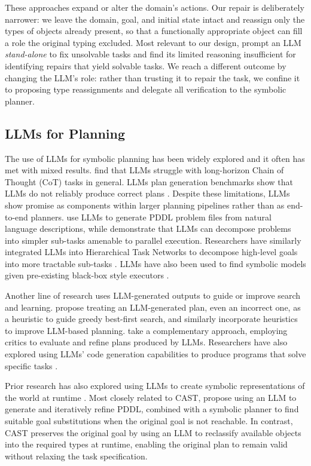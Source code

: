These approaches expand or alter the domain's actions. Our repair is deliberately narrower: we leave the domain, goal, and initial state intact and reassign only the types of objects already present, so that a functionally appropriate object can fill a role the original typing excluded. Most relevant to our design, \citet{gragera2023exploring} prompt an LLM \emph{stand-alone} to fix unsolvable tasks and find its limited reasoning insufficient for identifying repairs that yield solvable tasks. We reach a different outcome by changing the LLM's role: rather than trusting it to repair the task, we confine it to proposing type reassignments and delegate all verification to the symbolic planner.

\subsection{LLMs for Planning}
The use of LLMs for symbolic planning has been widely explored and it often has met with
mixed results. \citet{motwani2026longcot} find that LLMs struggle with long-horizon Chain of Thought (CoT) tasks in general. LLMs plan generation benchmarks show that LLMs do not reliably produce correct plans
\citep{valmeekam_large_nodate, valmeekam2023planbenchextensiblebenchmarkevaluating}. Despite these limitations, LLMs show promise as components within larger planning pipelines rather than as end-to-end planners. \citet{liu_llmp_2023} use LLMs to generate PDDL problem files from natural language descriptions, while \citet{singh_twostep_2024} demonstrate that LLMs can decompose problems into simpler sub-tasks amenable to parallel execution. Researchers have similarly integrated LLMs into Hierarchical Task Networks to decompose high-level goals into more tractable sub-tasks \citep{pmlr-v288-munoz-avila25a, xu2025online}. LLMs have also been used to find symbolic models given pre-existing black-box style executors \cite{yang2026skillwrappergenerativepredicateinvention}.

Another line of research uses LLM-generated outputs to guide or improve
search and learning. \citet{silver2022pddl} propose treating an LLM-generated
plan, even an incorrect one, as a heuristic to guide greedy
best-first search, and \citet{hazra_saycanpay_2024} similarly incorporate heuristics to improve LLM-based planning. \citet{kambhampati_llms_2024} take a complementary
approach, employing critics to evaluate and refine plans produced by
LLMs. Researchers have also explored
using LLMs' code generation capabilities to produce programs that
solve specific tasks \citep{silver2024generalized}.

Prior research has also explored using LLMs to create symbolic representations of the world at runtime \cite{argenziano2024empowerembodiedmultiroleopenvocabulary}. Most closely related to CAST, \citet{musumeci2025context} propose using an LLM to generate and iteratively refine PDDL, combined with a symbolic planner to find suitable goal substitutions when the original goal is not reachable. In contrast, CAST preserves the original goal by using an LLM to reclassify available objects into the required types at runtime, enabling the original plan to remain valid without relaxing the task specification.